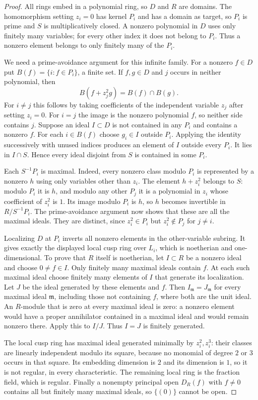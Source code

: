 \begin{proof}
All rings embed in a polynomial ring, so $D$ and $R$ are domains.
The homomorphism setting $z_i=0$ has kernel $P_i$ and has a domain
as target, so $P_i$ is prime and $S$ is multiplicatively closed.
A nonzero polynomial in $D$ uses only finitely many variables; for
every other index it does not belong to $P_i$.  Thus a nonzero
element belongs to only finitely many of the $P_i$.

We need a prime-avoidance argument for this infinite family.
For a nonzero $f\in D$ put $B(f)=\{i:f\in P_i\}$, a finite set.
If $f,g\in D$ and $j$ occurs in neither polynomial, then
\[
 B(f+z_j^2g)=B(f)\cap B(g).
\]
For $i\ne j$ this follows by taking coefficients of the independent
variable $z_j$ after setting $z_i=0$.  For $i=j$ the image is the
nonzero polynomial $f$, so neither side contains $j$.
Suppose an ideal $I\subset D$ is not contained in any $P_i$ and
contains a nonzero $f$.  For each $i\in B(f)$ choose $g_i\in I$
outside $P_i$.  Applying the identity successively with unused
indices produces an element of $I$ outside every $P_i$.
It lies in $I\cap S$.  Hence every ideal disjoint from $S$ is
contained in some $P_i$.

Each $S^{-1}P_i$ is maximal.  Indeed, every nonzero class modulo
$P_i$ is represented by a nonzero $h$ using only variables other
than $z_i$.  The element $h+z_i^2$ belongs to $S$: modulo $P_i$
it is $h$, and modulo any other $P_j$ it is a polynomial in $z_i$
whose coefficient of $z_i^2$ is $1$.  Its image modulo $P_i$ is
$h$, so $h$ becomes invertible in $R/S^{-1}P_i$.
The prime-avoidance argument now shows that these are all the
maximal ideals.  They are distinct, since $z_i^2\in P_i$ but
$z_i^2\notin P_j$ for $j\ne i$.

Localizing $D$ at $P_i$ inverts all nonzero elements in the
other-variable subring.  It gives exactly the displayed local
cusp ring over $L_i$, which is noetherian and one-dimensional.
To prove that $R$ itself is noetherian, let $I\subset R$ be a
nonzero ideal and choose $0\ne f\in I$.  Only finitely many maximal
ideals contain $f$.  At each such maximal ideal choose finitely
many elements of $I$ that generate its localization.  Let $J$ be
the ideal generated by these elements and $f$.  Then $I_{\mathfrak m}
=J_{\mathfrak m}$ for every maximal ideal $\mathfrak m$, including
those not containing $f$, where both are the unit ideal.
An $R$-module that is zero at every maximal ideal is zero: a
nonzero element would have a proper annihilator contained in a
maximal ideal and would remain nonzero there.  Apply this to
$I/J$.  Thus $I=J$ is finitely generated.

The local cusp ring has maximal ideal generated minimally by
$z_i^2,z_i^3$: their classes are linearly independent modulo its
square, because no monomial of degree $2$ or $3$ occurs in that
square.  Its embedding dimension is $2$ and its dimension is $1$,
so it is not regular, in every characteristic.  The remaining
local ring is the fraction field, which is regular.  Finally a
nonempty principal open $D_R(f)$ with $f\ne0$ contains all but
finitely many maximal ideals, so $\{(0)\}$ cannot be open.
\end{proof}

